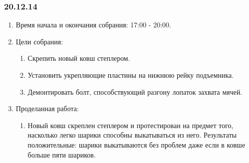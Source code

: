 \subsubsection{20.12.14}
\begin{enumerate}
	
	\item Время начала и окончания собрания: 17:00 - 20:00.
	
	\item Цели собрания: 
	\begin{enumerate}
		
		\item Скрепить новый ковш степлером.
		
		\item Установить укрепляющие пластины на нижнюю рейку подъемника.
		
		\item Демонтировать болт, способствующий разгону лопаток захвата мячей.
		
	\end{enumerate}
	\item Проделанная работа:
	\begin{enumerate}
		
		\item Новый ковш скреплен степлером и протестирован на предмет того, насколько легко шарики способны выкатываться из него. Результаты положительные: шарики выкатываются без проблем даже если в ковше больше пяти шариков.
		

\end{enumerate}
\end{enumerate}
